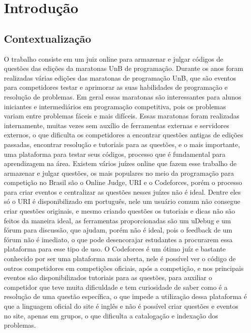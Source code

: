 \chapter*[Introdução]{Introdução}

\section{Contextualização}

O trabalho consiste em um juiz online para armazenar e julgar códigos de questões das edições da maratonas UnB de programação. 
Durante os anos foram realizadas várias edições das maratonas de programação UnB, que são eventos para competidores testar e aprimorar as suas habilidades de programação e resolução de problemas. Em geral essas maratonas são interessantes para alunos iniciantes e intermediários em programação competitiva, pois os problemas variam entre problemas fáceis e mais difíceis. Essas maratonas foram realizadas internamente, muitas vezes sem auxílio de ferramentas externas e servidores externos, o que dificulta os competidores a encontrar questões antigas de edições passadas, encontrar resolução e tutoriais para as questões, e o mais importante, uma plataforma para testar seus códigos, processo que é fundamental para aprendizagem na área. 
Existem vários juízes online que fazem esse trabalho de armazenar e julgar questões, os mais populares no meio da programação para competição no Brasil são o Online Judge, URI e o Codeforces, porém o processo para criar eventos e centralizar as questões nesses juízes não é ideal. Dentre eles só o URI é disponibilizado em português, nele um usuário comum não consegue criar questões originais, e mesmo criando questões os tutoriais e dicas não são feitos da maneira ideal, as ferramentas proporcionadas são um uDebug e um fórum para discussão, que ajudam, porém não é ideal, pois o feedback de um fórum não é imediato, o que pode desencorajar estudantes a procurarem essa plataforma para esse tipo de uso. O Codeforces é um ótimo juíz e bastante conhecido por ser uma plataforma mais aberta, nele é possível ver o código de outros competidores em competições oficiais, após a competição, e nos principais eventos são disponibilizados tutoriais para as questões, para auxiliar o competidor que teve muita dificuldade e tem curiosidade de saber como é a resolução de uma questão específica, o que impede a utilização dessa plataforma é que a linguagem oficial do site é inglês e não é possível criar questões e eventos no site, apenas em grupos, o que dificulta a catalogação e indexação dos problemas.
